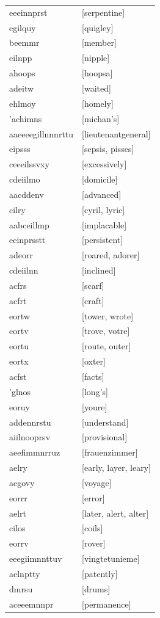 \documentclass{article}
\begin{document}
\begin{tabular}{ll}
eeeinnprst & [serpentine] \\
egilquy & [quigley] \\
beemmr & [member] \\
eilnpp & [nipple] \\
ahoops & [hoopsa] \\
adeitw & [waited] \\
ehlmoy & [homely] \\
'achimns & [michan's] \\
aaeeeegillnnnrttu & [lieutenantgeneral] \\
eipsss & [sepsis, pisses] \\
ceeeilssvxy & [excessively] \\
cdeiilmo & [domicile] \\
aacddenv & [advanced] \\
cilry & [cyril, lyric] \\
aabceillmp & [implacable] \\
eeinprsstt & [persistent] \\
adeorr & [roared, adorer] \\
cdeiilnn & [inclined] \\
acfrs & [scarf] \\
acfrt & [craft] \\
eortw & [tower, wrote] \\
eortv & [trove, votre] \\
eortu & [route, outer] \\
eortx & [oxter] \\
acfst & [facts] \\
'glnos & [long's] \\
eoruy & [youre] \\
addennrstu & [understand] \\
aiilnooprsv & [provisional] \\
aeefimmnrruz & [frauenzimmer] \\
aelry & [early, layer, leary] \\
aegovy & [voyage] \\
eorrr & [error] \\
aelrt & [later, alert, alter] \\
cilos & [coils] \\
eorrv & [rover] \\
eeegiimnnttuv & [vingtetunieme] \\
aelnptty & [patently] \\
dmrsu & [drums] \\
aceeemnnpr & [permanence] \\

\end{tabular}
\end{document}
